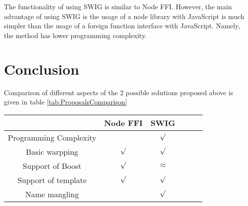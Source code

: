 The functionality of using SWIG is similar to Node FFI. However, the main advantage of using SWIG is the usage of a node library with JavaScript is much simpler than the usage of a foreign function interface with JavaScript. Namely, the method has lower programming complexity. 

\section{Conclusion}
Comparison of different aspects of the 2 possible solutions proposed above is given in table  \ref{tab:ProposalsComparison}

\begin{table*} %
    \begin{center}
        \begin{tabular}{c|ccccc}
                                     & Node FFI & SWIG  \\
            \hline
            Programming Complexity   &          &$\surd$ \\  
            
            Basic warpping           &  $\surd$  &$\surd$ \\ 
            
            Support of Boost         & $\surd$  &$\approx$\\
            
            Support of template      &  $\surd$  &$\surd$ \\
                        
            Name mangling            &           &$\surd$ \\ 
             
        \end{tabular}
    \end{center}
    \caption{Comparison of various proposals}
    \label{tab:ProposalsComparison}
\end{table*}

\begin{comment}
If too many ideas have been enumerated and none can be totally and formally demonstrated to be the best, then some choice has probably to bemade in order to limit the time-consuming experiments that follow.  It is preferable to achieve a few well-conducted experiments that will provide unquestionable conclusions though in a limited scope.
\end{comment}



